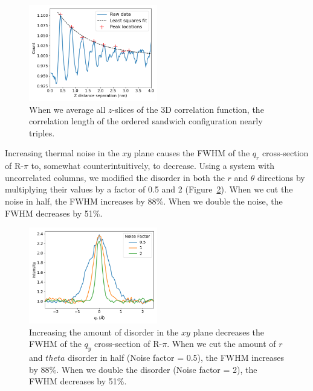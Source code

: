 \documentclass[journal=jpcbfk,manuscript=article]{achemso}
\begin{document}
  \begin{figure}
  \centering
  \includegraphics[width=0.5\textwidth]{z_correlation_fullbox.png}
  \caption{When we average all $z$-slices of the 3D correlation function, the 
  correlation length of the ordered sandwich configuration nearly triples.}\label{fig:z_correlation_fullbox}
  \end{figure}
  
  Increasing thermal noise in the $xy$ plane causes the FWHM of the $q_r$
  cross-section of R-$\pi$ to, somewhat counterintuitively, to decrease. Using a system with uncorrelated columns,
  we modified the disorder in both the $r$ and $\theta$ directions by multiplying
  their values by a factor of 0.5 and 2 (Figure~\ref{fig:qy_fwhm}). When we cut
  the noise in half, the FWHM increases by 88\%. When we double the noise, the
  FWHM decreases by 51\%.
  
  \begin{figure}
  \centering
  \includegraphics[width=0.5\textwidth]{qy_fwhm.png}
  \caption{Increasing the amount of disorder in the $xy$ plane decreases the
	  FWHM of the $q_y$ cross-section of R-$\pi$. When we cut the amount of $r$ and
	  $theta$ disorder in half (Noise factor = 0.5), the FWHM increases by 88\%. When
	  we double the disorder (Noise factor = 2), the FWHM decreases by
	  51\%.}\label{fig:qy_fwhm}
  \end{figure}
  
\end{document}
